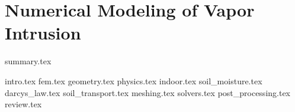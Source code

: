 \documentclass[../thesis.tex]{subfiles}
\begin{document}
\chapter{Numerical Modeling of Vapor Intrusion}\label{chp:modeling}

{summary.tex}

{intro.tex}
{fem.tex}
{geometry.tex}
{physics.tex}
{indoor.tex}
{soil_moisture.tex}
{darcys_law.tex}
{soil_transport.tex}
{meshing.tex}
{solvers.tex}
{post_processing.tex}
{review.tex}
\end{document}
